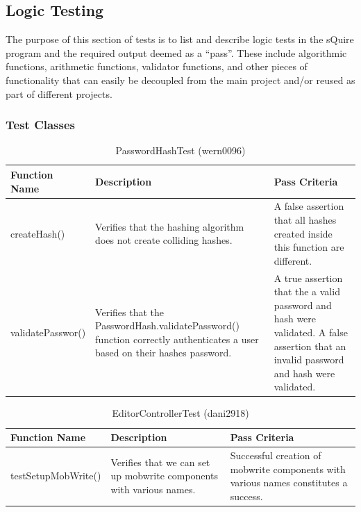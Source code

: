 \documentclass[twoside,letterpaper]{article}
\begin{document}
\newpage

\subsection{Logic Testing}

The purpose of this section of tests is to list and describe logic tests in the sQuire program and the required output deemed as a ``pass''. These include algorithmic functions, arithmetic functions, validator functions, and other pieces of functionality that can easily be decoupled from the main project and/or reused as part of different projects.

\subsubsection{Test Classes}

\begin{table}[h]
	\centering	
	\caption{PasswordHashTest (wern0096)}
	\begin{tabular}{|p{3cm}|p{6cm}|p{6cm}|} 
		\hline
		\textbf{Function Name} & \textbf{Description} & \textbf{Pass Criteria}  \\\hline
		createHash() & Verifies that the hashing algorithm does not create colliding hashes. & A false assertion that all hashes created inside this function are different. \\\hline
		validatePasswor() & Verifies that the PasswordHash.validatePassword() function correctly authenticates a user based on their hashes password. & A true assertion that the a valid password and hash were validated. A false assertion that an invalid password and hash were validated.  \\\hline
	\end{tabular}
\end{table}


\begin{table}[h]
	\centering
	\caption{EditorControllerTest (dani2918)}
	\begin{tabular}{|p{3cm}|p{6cm}|p{6cm}|}
		\hline
		\textbf{Function Name} & \textbf{Description} & \textbf{Pass Criteria}  \\\hline
		testSetupMobWrite() & Verifies that we can set up mobwrite components with various names. & Successful creation of mobwrite components with various names constitutes a success.
		\\\hline
	\end{tabular}
\end{table}
\end{document}
